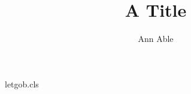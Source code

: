 \begin{filecontents*}[overwrite]{letgob.cls}
\newcommand\corr[1]{\expandafter\gdef\csname nc@corr\endcsname{#1}}
\let\thanks\@gobble
\renewcommand\maketitle{\par\begingroup\centering{\Large\@title\par}%
  {\@author\thanks{Corresponding author: \csname nc@corr\endcsname}\par}\@thanks\endgroup}
\end{filecontents*}
\documentclass{letgob}

\title{A Title}
\author{Ann Able}
\maketitle
Text.

